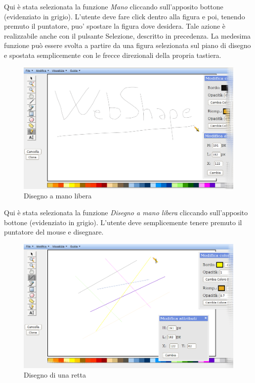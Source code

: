 \vspace{300pt}
Qui \`e stata selezionata la funzione \textit{Mano} cliccando sull'apposito bottone (evidenziato in grigio). L'utente deve fare click dentro alla figura e poi, tenendo premuto il puntatore, puo' spostare la figura dove desidera. Tale azione \`e realizzabile anche con il pulsante Selezione, descritto in precedenza. La medesima funzione pu\`o essere svolta a partire da una figura selezionata sul piano di disegno e spostata semplicemente con le frecce direzionali della propria tastiera.

\begin{figure}[!ht]
\centering
\includegraphics[scale=4]{images/matita.png}
\caption{Disegno a mano libera}
\end{figure} 

\vspace{300pt}
Qui \`e stata selezionata la funzione \textit{Disegno a mano libera} cliccando sull'apposito bottone (evidenziato in grigio). L'utente deve semplicemente tenere premuto il puntatore del mouse e disegnare.

\begin{figure}[!ht]
\centering
\includegraphics[scale=4]{images/linea.png}
\caption{Disegno di una retta}
\end{figure} 

